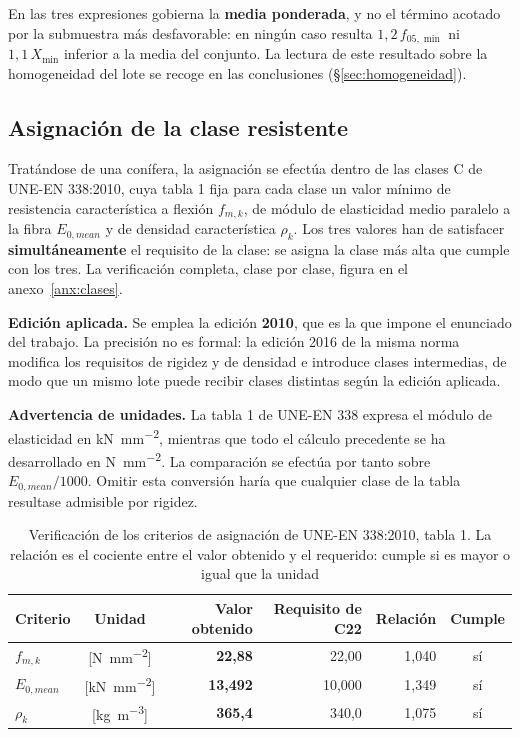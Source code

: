 \documentclass[11pt,a4paper]{article}
\begin{document}
\noindent En las tres expresiones gobierna la \textbf{media ponderada}, y no el término
acotado por la submuestra más desfavorable: en ningún caso resulta $1{,}2\,f_{05,\min}$
ni $1{,}1\,X_{\min}$ inferior a la media del conjunto. La lectura de este resultado
sobre la homogeneidad del lote se recoge en las conclusiones (\S\ref{sec:homogeneidad}).

\subsection{Asignación de la clase resistente}
\label{sec:asignacion}

Tratándose de una conífera, la asignación se efectúa dentro de las clases C de
UNE-EN 338:2010, cuya tabla 1 fija para cada clase un valor mínimo de resistencia
característica a flexión $f_{m,k}$, de módulo de elasticidad medio paralelo a la fibra
$E_{0,mean}$ y de densidad característica $\rho_{k}$. Los tres valores han de satisfacer
\textbf{simultáneamente} el requisito de la clase: se asigna la clase más alta que
cumple con los tres. La verificación completa, clase por clase, figura en el
anexo~\ref{anx:clases}.

\medskip
\noindent\textbf{Edición aplicada.} Se emplea la edición \textbf{2010}, que es la que
impone el enunciado del trabajo. La precisión no es formal: la edición 2016 de la misma
norma modifica los requisitos de rigidez y de densidad e introduce clases intermedias,
de modo que un mismo lote puede recibir clases distintas según la edición aplicada.

\medskip
\noindent\textbf{Advertencia de unidades.} La tabla 1 de UNE-EN 338 expresa el módulo de
elasticidad en \si{\kilo\newton\per\square\milli\meter}, mientras que todo el cálculo
precedente se ha desarrollado en \si{\newton\per\square\milli\meter}. La comparación se
efectúa por tanto sobre $E_{0,mean}/1000$. Omitir esta conversión haría que cualquier
clase de la tabla resultase admisible por rigidez.

\begin{table}[H]
\centering
\caption[Verificación de los criterios de asignación de UNE-EN 338:2010, tabla 1]{Verificación de los criterios de asignación de UNE-EN 338:2010, tabla 1. La relación es el cociente entre el valor obtenido y el requerido: cumple si es mayor o igual que la unidad}
\begin{tabular}{l c r r r c}
\toprule
\textbf{Criterio} & \textbf{Unidad} & \textbf{Valor obtenido} & \textbf{Requisito de C22} & \textbf{Relación} & \textbf{Cumple} \\
\midrule
$f_{m,k}$ & [\si{\newton\per\square\milli\meter}] & \textbf{22,88} & 22,00 & 1,040 & sí \\
$E_{0,mean}$ & [\si{\kilo\newton\per\square\milli\meter}] & \textbf{13,492} & 10,000 & 1,349 & sí \\
$\rho_{k}$ & [\si{\kilo\gram\per\cubic\meter}] & \textbf{365,4} & 340,0 & 1,075 & sí \\
\bottomrule
\end{tabular}
\end{table}
\end{document}
